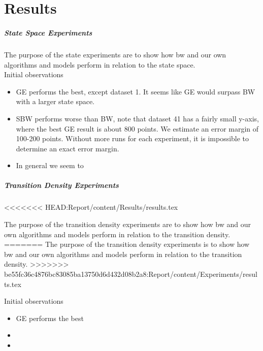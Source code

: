 \FloatBarrier

\chapter{Results}\label{sec:results}

\paragraph{State Space Experiments}

The purpose of the state experiments are to show how \gls{bw} and our own algorithms and models perform in relation to the state space.\\

	

Initial observations
\begin{itemize}
\item GE performs the best, except dataset 1. It seems like GE would surpass BW with a larger state space.
\item SBW performs worse than BW, note that dataset 41 has a fairly small y-axis, where the best GE result is about 800 points. We estimate an error margin of 100-200 points. Without more runs for each experiment, it is impossible to determine an exact error margin.
\item In general we seem to 
\end{itemize}


\paragraph{Transition Density Experiments}
<<<<<<< HEAD:Report/content/Results/results.tex

The purpose of the transition density experiments are to show how \gls{bw} and our own algorithms and models perform in relation to the transition density.\\
=======
The purpose of the transition density experiments is to show how \gls{bw} and our own algorithms and models perform in relation to the transition density.
>>>>>>> be55fc36c4876bc83085ba13750d6d432d08b2a8:Report/content/Experiments/results.tex

	

Initial observations
\begin{itemize}
\item GE performs the best
\item 
\item 
\end{itemize}

